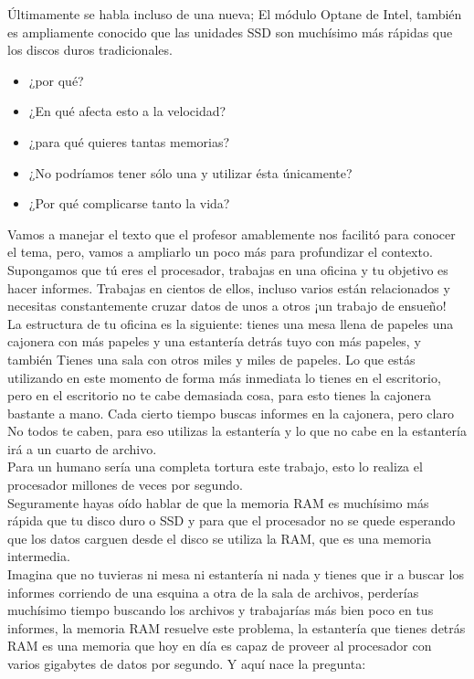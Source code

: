 \documentclass{article}
\begin{document}
Últimamente se habla incluso de una nueva; El módulo Optane de Intel, también es ampliamente conocido que las unidades SSD son muchísimo más rápidas que los discos duros tradicionales. 

\begin{itemize}
    \item ¿por qué?
    \item¿En qué afecta esto a la velocidad? 
    \item¿para qué quieres tantas memorias?
    \item¿No podríamos tener sólo una y utilizar ésta únicamente? 
    \item¿Por qué complicarse tanto la vida?

\end{itemize}

Vamos a manejar el texto que el profesor amablemente nos facilitó para conocer el tema, pero, vamos a ampliarlo un poco más para profundizar el contexto.\cite{youbioit} Supongamos que tú eres el procesador, trabajas en una oficina y tu objetivo es hacer informes. Trabajas en cientos de ellos, incluso varios están relacionados y necesitas constantemente cruzar datos de unos a otros ¡un trabajo de ensueño!\\

La estructura de tu oficina es la siguiente: tienes una mesa llena de papeles una cajonera con más papeles y una estantería detrás tuyo con más papeles, y también Tienes una sala con otros miles y miles de papeles. Lo que estás utilizando en este momento de forma más inmediata lo tienes en el escritorio, pero en el escritorio no te cabe demasiada cosa, para esto tienes la cajonera bastante a mano. Cada cierto tiempo buscas informes en la cajonera, pero claro No todos te caben, para eso utilizas la estantería y lo que no cabe en la estantería irá a un cuarto de archivo.\\

Para un humano sería una completa tortura este trabajo, esto lo realiza el procesador millones de veces por segundo.\\ 

Seguramente hayas oído hablar de que la memoria RAM es muchísimo más rápida que tu disco duro o SSD y para que el procesador no se quede esperando que los datos carguen desde el disco se utiliza la RAM, que es una memoria intermedia.\\

Imagina que no tuvieras ni mesa ni estantería ni nada y tienes que ir a buscar los informes corriendo de una esquina a otra de la sala de archivos, perderías muchísimo tiempo buscando los archivos y trabajarías más bien poco en tus informes, la memoria RAM resuelve este problema, la estantería que tienes detrás RAM es una memoria que hoy en día es capaz de proveer al procesador con varios gigabytes de datos por segundo. Y aquí nace la pregunta:
\end{document}
